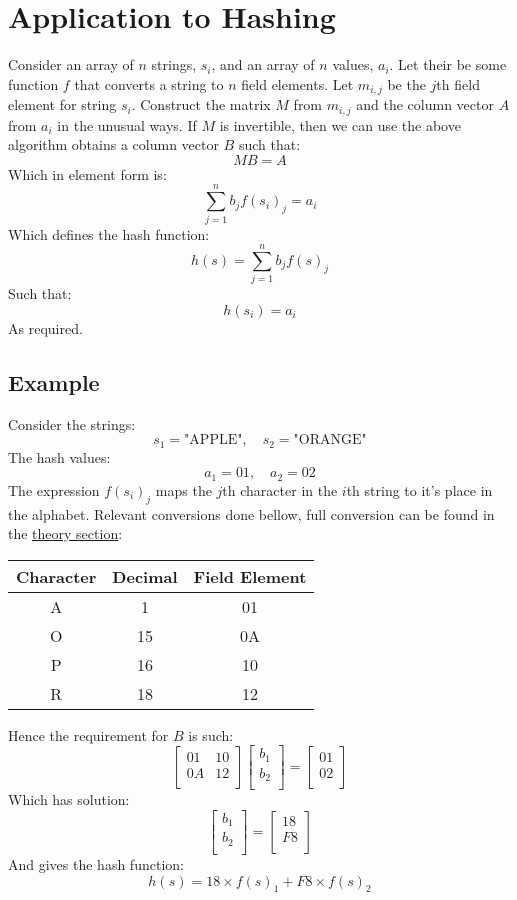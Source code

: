 \section{Application to Hashing}
Consider an array of $n$ strings, $s_i$, and an array of $n$ values, $a_i$.
Let their be some function $f$ that converts a string to $n$ field elements.
Let $m_{i,j}$ be the $j$th field element for string $s_i$.
Construct the matrix $M$ from $m_{i,j}$ and the column vector $A$ from $a_i$ in the unusual ways.
If $M$ is invertible, then we can use the above algorithm obtains a column vector $B$ such that:
\[MB = A\]
Which in element form is:
\[\sum_{j=1}^nb_jf(s_i)_j = a_i\]
Which defines the hash function:
\[h(s)=\sum_{j=1}^nb_jf(s)_j\]
Such that:
\[h(s_i) = a_i\]
As required.

\subsection{Example}
Consider the strings:
\[s_1 = \text{"APPLE"},\quad s_2 = \text{"ORANGE"} \]
The hash values:
\[a_1 = 01,\quad a_2 = 02\]
The expression $f(s_i)_j$ maps the $j$th character in the $i$th string to it's place in the alphabet.
Relevant conversions done bellow,
full conversion can be found in the \hyperref[theory:byte]{theory section}:

\begin{center}
\begin{tabular}{|c|c|c|}
	\hline
	Character & Decimal & Field Element \\	
	\hline
	A &  1 & 01 \\
	O & 15 & 0A \\
	P & 16 & 10 \\
	R & 18 & 12 \\
	\hline
\end{tabular}
\end{center}

Hence the requirement for $B$ is such:
\[ 
\begin{bmatrix}
	01&10\\
	0A&12\\
\end{bmatrix}
\begin{bmatrix}
	b_1 \\ b_2\\
\end{bmatrix}
=
\begin{bmatrix}
	01\\ 02 \\
\end{bmatrix}
\]
Which has solution:
\[
\begin{bmatrix}
	b_1 \\ b_2\\
\end{bmatrix}
=
\begin{bmatrix}
	18\\F8 \\
\end{bmatrix}
\]
And gives the hash function:
\[h(s) = 18\times f(s)_1+F8\times f(s)_2\]

